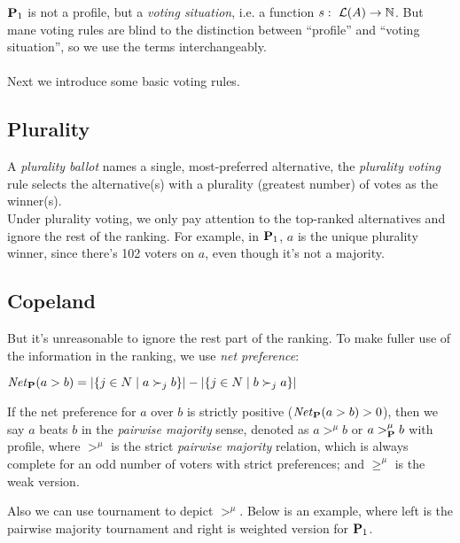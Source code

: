 $\mathbf{P}_1$ is not a profile, but a \textit{voting situation}, i.e. a function $s:\ \mathcal{L}(A) \to \mathbb{N}$. But mane voting rules are blind to the distinction between “profile” and “voting situation”, so we use the terms interchangeably.\\
~\\
Next we introduce some basic voting rules.

\subsection{Plurality}

A \textit{plurality ballot} names a single, most-preferred alternative, the \textit{plurality voting} rule selects the alternative(s) with a plurality (greatest number) of votes as the winner(s). \\
Under plurality voting, we only pay attention to the top-ranked alternatives and ignore the rest of the ranking. For example, in $\mathbf{P}_1$, $a$ is the unique plurality winner, since there's 102 voters on $a$, even though it's not a majority.

\subsection{Copeland}

But it's unreasonable to ignore the rest part of the ranking. To make fuller use of the information in the ranking, we use \textit{net preference}:
~\\
\begin{definition}
    \label{net}
    $\mathit{Net}_{\mathbf{P}}(a>b) = |\{j \in N\;|\; a \succ_j b\}| - |\{j \in N\;|\; b \succ_j a\}|$
\end{definition}

If the net preference for $a$ over $b$ is strictly positive ($\mathit{Net}_{\mathbf{P}}(a>b) > 0$), then we say $a$ beats $b$ in the \textit{pairwise majority} sense, denoted as $a >^\mu b$ or $a >^\mu_{\mathbf{P}} b$ with profile, where $>^\mu$ is the strict \textit{pairwise majority} relation, which is always complete for an odd number of voters with strict preferences; and $\geq^\mu$ is the weak version.

Also we can use tournament to depict $>^\mu$. Below is an example, where left is the pairwise majority tournament and right is weighted version for $\mathbf{P}_1$.

\begin{center}
\end{center}

